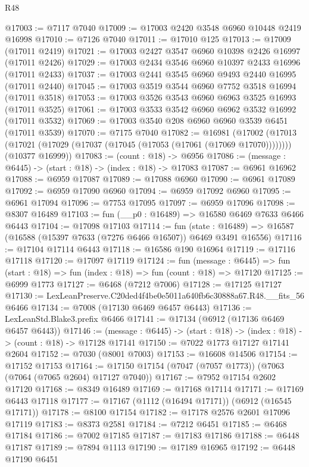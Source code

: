 \begin{lexlean}{R48}
\begin{coremodule}
@17003 := @7117 @7040
@17009 := @17003 @2420 @3548 @6960 @10448 @2419 @16998
@17010 := @7126 @7040
@17011 := @17010 @125
@17013 := @17009 (@17011 @2419)
@17021 := @17003 @2427 @3547 @6960 @10398 @2426 @16997 (@17011 @2426)
@17029 := @17003 @2434 @3546 @6960 @10397 @2433 @16996 (@17011 @2433)
@17037 := @17003 @2441 @3545 @6960 @9493 @2440 @16995 (@17011 @2440)
@17045 := @17003 @3519 @3544 @6960 @7752 @3518 @16994 (@17011 @3518)
@17053 := @17003 @3526 @3543 @6960 @6963 @3525 @16993 (@17011 @3525)
@17061 := @17003 @3533 @3542 @6960 @6962 @3532 @16992 (@17011 @3532)
@17069 := @17003 @3540 @208 @6960 @6960 @3539 @6451 (@17011 @3539)
@17070 := @7175 @7040
@17082 := @16981
    (@17002
      (@17013 (@17021 (@17029 (@17037 (@17045 (@17053 (@17061 (@17069 @17070))))))))
      (@10377 @16999))
@17083 := (count : @18) -> @6956
@17086 := (message : @6445) -> (start : @18) -> (index : @18) -> @17083
@17087 := @6961 @16962
@17088 := @6959 @17087
@17089 := @17088 @6960
@17090 := @6961 @17089
@17092 := @6959 @17090 @6960
@17094 := @6959 @17092 @6960
@17095 := @6961 @17094
@17096 := @7753 @17095
@17097 := @6959 @17096
@17098 := @8307 @16489
@17103 := fun (__p0 : @16489) => @16580 @6469 @7633 @6466 @6443
@17104 := @17098 @17103
@17114 := fun (state : @16489) =>
  @16587 (@16588 (@15397 @7633 (@7276 @6466 @16507)) @6469 @3491 @16556)
@17116 := @17104 @17114 @6443
@17118 := @16586 @190 @16964
@17119 := @17116 @17118
@17120 := @17097 @17119
@17124 := fun (message : @6445) =>
  fun (start : @18) => fun (index : @18) => fun (count : @18) => @17120
@17125 := @6999 @1773
@17127 := @6468 (@7212 @7006)
@17128 := @17125 @17127
@17130 := LexLeanPreserve.C20ded4f4be0e5011a640fb6c30888a67.R48.__fits_56 @6466
@17134 := @7008 (@17130 @6469 @6457 @6443)
@17136 := LexLeanStd.Blake3.prefix @6466
@17141 := @17134 (@6912 (@17136 @6469 @6457 @6443))
@17146 := (message : @6445) -> (start : @18) -> (index : @18) -> (count : @18) -> @17128 @17141
@17150 := @7022 @1773 @17127 @17141 @2604
@17152 := @7030 (@8001 @7003)
@17153 := @16608 @14506
@17154 := @17152 @17153
@17164 := @17150 @17154 (@7047 (@7057 @1773)) (@7063 (@7064 (@7065 @2604) @17127 @7040))
@17167 := @7952 @17154 @2602 @17120
@17168 := @8349 @16489
@17169 := @17168 @17114
@17171 := @17169 @6443 @17118
@17177 := @17167 (@1112 (@16494 @17171)) (@6912 (@16545 @17171))
@17178 := @8100 @17154
@17182 := @17178 @2576 @2601 @17096 @17119
@17183 := @8373 @2581
@17184 := @7212 @6451
@17185 := @6468 @17184
@17186 := @7002 @17185
@17187 := @17183 @17186
@17188 := @6448 @17187
@17189 := @7894 @1113
@17190 := @17189 @16965
@17192 := @6448 @17190 @6451

\end{coremodule}
\end{lexlean}
